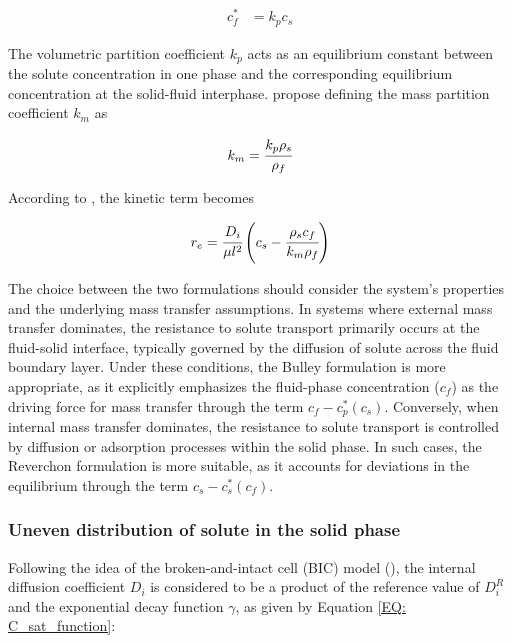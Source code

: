 \documentclass[a4paper,fleqn]{cas-dc}
\begin{document}
	{\footnotesize
		\begin{align} \label{Linear_equilibirum}
			c_f^* &= k_p c_s
	\end{align} }
	
	The volumetric partition coefficient $k_p$ acts as an equilibrium constant between the solute concentration in one phase and the corresponding equilibrium concentration at the solid-fluid interphase. \citet{Spiro2007} propose defining the mass partition coefficient $k_m$ as 
	
	{\footnotesize
		\begin{align}
			k_m = \cfrac{k_p \rho_s}{\rho_f}
	\end{align} }
	
	According to \citet{Reverchon1996}, the kinetic term becomes
	
	{\footnotesize
		\begin{equation}
			\label{Model_kinetic_no_sat}
			r_e = \cfrac{D_i}{ \mu l^2 } \left(c_s - \cfrac{\rho_s c_f}{k_m \rho_f} \right)
	\end{equation} }

	The choice between the two formulations should consider the system's properties and the underlying mass transfer assumptions. In systems where external mass transfer dominates, the resistance to solute transport primarily occurs at the fluid-solid interface, typically governed by the diffusion of solute across the fluid boundary layer. Under these conditions, the Bulley formulation is more appropriate, as it explicitly emphasizes the fluid-phase concentration ($c_f$) as the driving force for mass transfer through the term $c_f - c_p^*(c_s)$. Conversely, when internal mass transfer dominates, the resistance to solute transport is controlled by diffusion or adsorption processes within the solid phase. In such cases, the Reverchon formulation is more suitable, as it accounts for deviations in the equilibrium through the term $c_s - c_s^*(c_f)$.
	
	\subsubsection{Uneven distribution of solute in the solid phase} \label{CH: Gamma_Function}
	
	Following the idea of the broken-and-intact cell (BIC) model (\citet{Sovova2017}), the internal diffusion coefficient $D_i$ is considered to be a product of the reference value of $D_i^R$ and the exponential decay function $\gamma$, as given by Equation \ref{EQ: C_sat_function}:
	
\end{document}
